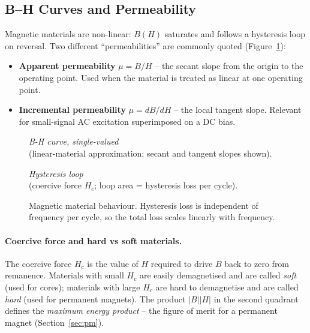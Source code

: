 \documentclass[12pt,a4paper]{article}
\begin{document}
\subsection{B--H Curves and Permeability}

Magnetic materials are non-linear: $B(H)$ saturates and follows a
hysteresis loop on reversal.
Two different ``permeabilities'' are commonly quoted
(Figure~\ref{fig:bh}):
\begin{itemize}[noitemsep]
  \item \textbf{Apparent permeability} $\mu = B/H$ -- the secant slope
        from the origin to the operating point. Used when the material
        is treated as linear at one operating point.
  \item \textbf{Incremental permeability} $\mu = dB/dH$ -- the local
        tangent slope. Relevant for small-signal AC excitation
        superimposed on a DC bias.
\end{itemize}

\begin{figure}[H]
  \centering
  \begin{minipage}{0.45\textwidth}\centering
    \textit{B-H curve, single-valued} \\[2pt]
    (linear-material approximation; secant and tangent slopes shown).
  \end{minipage}\hfill
  \begin{minipage}{0.45\textwidth}\centering
    \textit{Hysteresis loop} \\[2pt]
    (coercive force $H_c$; loop area = hysteresis loss per cycle).
  \end{minipage}
  \caption{Magnetic material behaviour. Hysteresis loss is independent
           of frequency per cycle, so the total loss scales linearly
           with frequency.}
  \label{fig:bh}
\end{figure}

\paragraph{Coercive force and hard vs soft materials.}
The coercive force $H_c$ is the value of $H$ required to drive $B$ back
to zero from remanence. Materials with small $H_c$ are easily
demagnetised and are called \emph{soft} (used for cores); materials
with large $H_c$ are hard to demagnetise and are called \emph{hard}
(used for permanent magnets). The product $|B||H|$ in the second
quadrant defines the \emph{maximum energy product} -- the figure of
merit for a permanent magnet (Section~\ref{sec:pm}).
\end{document}
